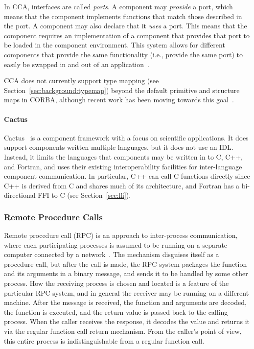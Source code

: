 In CCA, interfaces are called \emph{ports}. A component may \emph{provide} a port, which means that the component implements functions that match those described in the port. A component may also declare that it \emph{uses} a port. This means that the component requires an implementation of a component that provides that port to be loaded in the component environment. This system allows for different components that provide the same functionality (i.e., provide the same port) to easily be swapped in and out of an application~\cite{armstrong99common}.

CCA does not currently support type mapping (see Section~\ref{sec:background:typemap}) beyond the default primitive and structure maps in CORBA, although recent work has been moving towards this goal~\cite{onramp}.

\paragraph{Cactus}

Cactus~\cite{goodale07expressing, goodale03cactus} is a component framework with a focus on scientific applications. It does support components written multiple languages, but it does not use an IDL. Instead, it limits the languages that components may be written in to C, C++, and Fortran, and uses their existing interoperability facilities for inter-language component communication. In particular, C++ can call C functions directly since C++ is derived from C and shares much of its architecture, and Fortran has a bi-directional FFI to C (see Section~\ref{sec:ffi}).



\subsubsection{Remote Procedure Calls}

Remote procedure call (RPC) is an approach to inter-process communication, where each participating processes is assumed to be running on a separate computer connected by a network~\cite{hayes87mixed, birrell84rpc, tay90rpc, hansen20origin}. The mechanism disguises itself as a procedure call, but after the call is made, the RPC system packages the function and its arguments in a binary message, and sends it to be handled by some other process. How the receiving process is chosen and located is a feature of the particular RPC system, and in general the receiver may be running on a different machine. After the message is received, the function and arguments are decoded, the function is executed, and the return value is passed back to the calling process. When the caller receives the response, it decodes the value and returns it via the regular function call return mechanism. From the caller's point of view, this entire process is indistinguishable from a regular function call.


